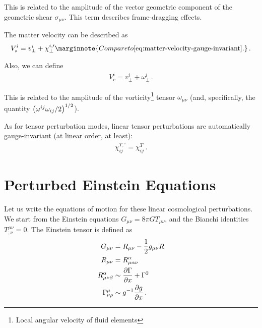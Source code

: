 \documentclass[main.tex]{subfiles}
\begin{document}
This is related to the amplitude of the vector geometric component of the geometric shear \(\sigma_{\mu \nu }\). 
This term describes frame-dragging effects. 

The matter velocity can be described as 
%
\begin{align}
V^{i}_{s} = v^{i}_{\perp} + \chi^{i, \prime}_{\perp}
\marginnote{Compare to \eqref{eq:matter-velocity-gauge-invariant}.}
\,.
\end{align}

Also, we can define 
%
\begin{align}
V^{i}_{c} = v^{i}_{\perp} + \omega^{i}_{\perp}
\,.
\end{align}

This is related to the amplitude of the vorticity\footnote{Local angular velocity of fluid elements} tensor \(\omega_{\mu \nu }\) (and, specifically, the quantity \(\qty(\omega^{ij} \omega_{ij} / 2)^{1/2}\)). 

As for tensor perturbation modes, linear tensor perturbations are automatically gauge-invariant (at linear order, at least): 
%
\begin{align}
\chi^{T, \prime}_{ij} =
\chi^{T}_{ij} 
\,.
\end{align}

\section{Perturbed Einstein Equations}

Let us write the equations of motion for these linear cosmological perturbations. 
We start from the Einstein equations \(G_{\mu \nu } = 8 \pi G T_{\mu \nu }\), and the Bianchi identities \(T^{\mu \nu }_{; \nu } = 0\). 
The Einstein tensor is defined as 
%
\begin{align}
G_{\mu \nu } &= R_{\mu \nu } - \frac{1}{2} g_{\mu \nu } R  \\
R_{\mu \nu } &= R^{\alpha }_{\mu \alpha \nu }  \\
R^{\alpha }_{\mu \nu \beta }&\sim \pdv{\Gamma }{x} + \Gamma^2  \\
\Gamma^{\mu }_{\nu \rho } &\sim g^{-1} \pdv{g}{x}
\,.
\end{align}
\end{document}
